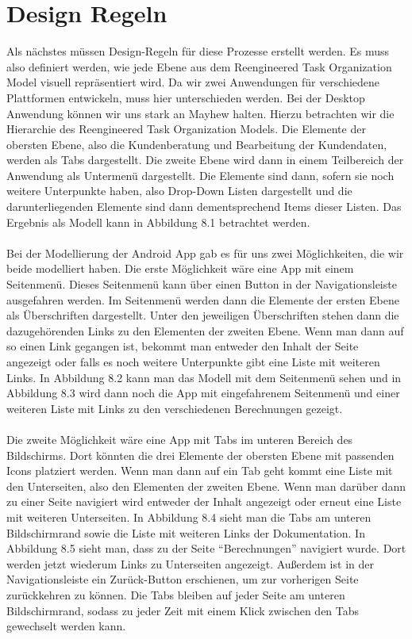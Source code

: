 \section{Design Regeln}

Als nächstes müssen Design-Regeln für diese Prozesse erstellt werden.  Es muss also definiert werden, wie jede Ebene aus dem Reengineered Task Organization Model visuell repräsentiert wird. Da wir zwei Anwendungen für verschiedene Plattformen entwickeln, muss hier unterschieden werden. Bei der Desktop Anwendung können wir uns stark an Mayhew halten. Hierzu betrachten wir die Hierarchie des Reengineered Task Organization Models. Die Elemente der obersten Ebene, also die Kundenberatung und Bearbeitung der Kundendaten, werden als Tabs dargestellt. Die zweite Ebene wird dann in einem Teilbereich der Anwendung als Untermenü dargestellt. Die Elemente sind dann, sofern sie noch weitere Unterpunkte haben, also Drop-Down Listen dargestellt und die darunterliegenden Elemente sind dann dementsprechend Items dieser Listen. Das Ergebnis als Modell kann in Abbildung 8.1 betrachtet werden.
\\ \\
Bei der Modellierung der Android App gab es für uns zwei Möglichkeiten, die wir beide modelliert haben. Die erste Möglichkeit wäre eine App mit einem Seitenmenü. Dieses Seitenmenü kann über einen Button in der Navigationsleiste ausgefahren werden. Im Seitenmenü werden dann die Elemente der ersten Ebene als Überschriften dargestellt. Unter den jeweiligen Überschriften stehen dann die dazugehörenden Links zu den Elementen der zweiten Ebene. Wenn man dann auf so einen Link gegangen ist, bekommt man entweder den Inhalt der Seite angezeigt oder falls es noch weitere Unterpunkte gibt eine Liste mit weiteren Links. In Abbildung 8.2 kann man das Modell mit dem Seitenmenü sehen und in Abbildung 8.3 wird dann noch die App mit eingefahrenem Seitenmenü und einer weiteren Liste mit Links zu den verschiedenen Berechnungen gezeigt.
\\ \\
Die zweite Möglichkeit wäre eine App mit Tabs im unteren Bereich des Bildschirms. Dort könnten die drei Elemente der obersten Ebene mit passenden Icons platziert werden. Wenn man dann auf ein Tab geht kommt eine Liste mit den Unterseiten, also den Elementen der zweiten Ebene. Wenn man darüber dann zu einer Seite navigiert wird entweder der Inhalt angezeigt oder erneut eine Liste mit weiteren Unterseiten. In Abbildung 8.4 sieht man die Tabs am unteren Bildschirmrand sowie die Liste mit weiteren Links der Dokumentation. In Abbildung 8.5 sieht man, dass zu der Seite ``Berechnungen'' navigiert wurde. Dort werden jetzt wiederum Links zu Unterseiten angezeigt. Außerdem ist in der Navigationsleiste ein Zurück-Button erschienen, um zur vorherigen Seite zurückkehren zu können. Die Tabs bleiben auf jeder Seite am unteren Bildschirmrand, sodass zu jeder Zeit mit einem Klick zwischen den Tabs gewechselt werden kann.

